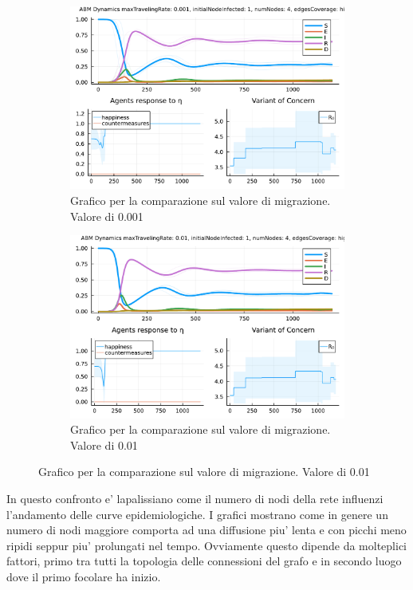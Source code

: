 \begin{figure}[!hb]
	\centering
	\begin{subfigure}[b]{0.45\textwidth}
		\centering
		\includegraphics[width=\textwidth]{img/SocialNetworkABM_1.pdf}
		\caption{Grafico per la comparazione sul valore di migrazione. Valore di 0.001}
		\label{fig:comparison_maxTravelingRate_low}
	\end{subfigure}
	\hfill
	\begin{subfigure}[b]{0.45\textwidth}
		\centering
		\includegraphics[width=\textwidth]{img/SocialNetworkABM_4.pdf}
		\caption{Grafico per la comparazione sul valore di migrazione. Valore di 0.01}
		\label{fig:comparison_maxTravelingRate_high}
	\end{subfigure}
\end{figure}

\newpage

In questo confronto e' lapalissiano come il numero di nodi della rete influenzi l'andamento delle curve epidemiologiche. 
I grafici mostrano come in genere un numero di nodi maggiore comporta ad una diffusione piu' lenta e con picchi meno ripidi
seppur piu' prolungati nel tempo. Ovviamente questo dipende da molteplici fattori, primo tra tutti la topologia delle connessioni 
del grafo e in secondo luogo dove il primo focolare ha inizio. 

